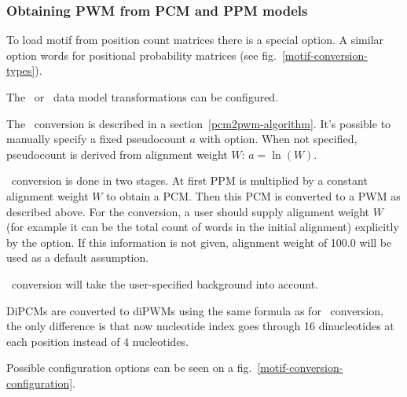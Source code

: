 \subsubsection{Obtaining PWM from PCM and PPM models}
To load motif from position count matrices there is a special  option.
A similar option  words for positional probability matrices (see fig.~\ref{motif-conversion-types}).

The \PcmToPwm\ or \PpmToPwm\ data model transformations can be configured.

The \PcmToPwm\ conversion is described in a section~\ref{pcm2pwm-algorithm}. It's possible to manually specify a fixed pseudocount $a$ with  option. When not specified, pseudocount is derived from alignment weight $W$: $a =\ln(W)$.

\PpmToPwm\ conversion is done in two stages. At first PPM is multiplied by a constant alignment weight $W$ to obtain a PCM. Then this PCM is converted to a PWM as described above.
For the \PpmToPwm conversion, a user should supply alignment weight $W$ (for example it can be the total count of words in the initial alignment) explicitly by the  option. If this information is not given, alignment weight of 100.0 will be used as a default assumption.

\PcmToPwm\ conversion will take the user-specified background into account.

DiPCMs are converted to diPWMs using the same formula as for \PcmToPwm\ conversion, the only difference is that now nucleotide index goes through 16 dinucleotides at each position instead of 4 nucleotides.

Possible configuration options can be seen on a fig.~\ref{motif-conversion-configuration}.
